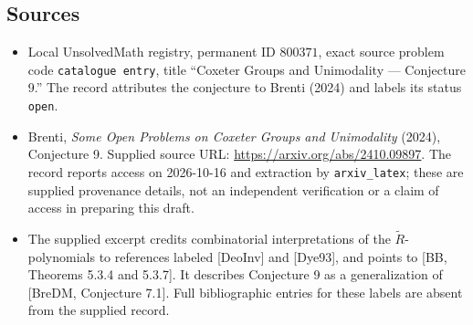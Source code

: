 \documentclass[11pt]{article}
\begin{document}
\subsection{Sources}
\begin{itemize}
\item Local UnsolvedMath registry, permanent ID \(800371\), exact source problem code \texttt{catalogue entry}, title ``Coxeter Groups and Unimodality --- Conjecture 9.'' The record attributes the conjecture to Brenti (2024) and labels its status \texttt{open}.
\item Brenti, \emph{Some Open Problems on Coxeter Groups and Unimodality} (2024), Conjecture 9. Supplied source URL: \url{https://arxiv.org/abs/2410.09897}. The record reports access on 2026-10-16 and extraction by \texttt{arxiv\_latex}; these are supplied provenance details, not an independent verification or a claim of access in preparing this draft.
\item The supplied excerpt credits combinatorial interpretations of the \(\widetilde R\)-polynomials to references labeled [DeoInv] and [Dye93], and points to [BB, Theorems 5.3.4 and 5.3.7]. It describes Conjecture 9 as a generalization of [BreDM, Conjecture 7.1]. Full bibliographic entries for these labels are absent from the supplied record.
\end{itemize}
\end{document}
